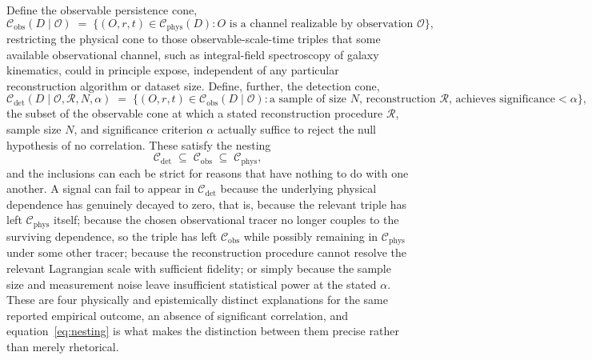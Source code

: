 \documentclass[11pt]{article}
\begin{document}
Define the observable persistence cone,
\begin{equation}
\mathcal C_{\mathrm{obs}}(D \mid \mathcal O) \;=\; \big\{ (O, r, t) \in \mathcal C_{\mathrm{phys}}(D) : O \text{ is a channel realizable by observation } \mathcal O \big\},
\end{equation}
restricting the physical cone to those observable-scale-time triples that some available observational channel, such as integral-field spectroscopy of galaxy kinematics, could in principle expose, independent of any particular reconstruction algorithm or dataset size. Define, further, the detection cone,
\begin{equation}
\mathcal C_{\mathrm{det}}(D \mid \mathcal O, \mathcal R, N, \alpha) \;=\; \big\{ (O, r, t) \in \mathcal C_{\mathrm{obs}}(D \mid \mathcal O) : \text{a sample of size } N \text{, reconstruction } \mathcal R \text{, achieves significance} < \alpha \big\},
\end{equation}
the subset of the observable cone at which a stated reconstruction procedure $\mathcal R$, sample size $N$, and significance criterion $\alpha$ actually suffice to reject the null hypothesis of no correlation. These satisfy the nesting
\begin{equation}
\mathcal C_{\mathrm{det}} \;\subseteq\; \mathcal C_{\mathrm{obs}} \;\subseteq\; \mathcal C_{\mathrm{phys}},
\label{eq:nesting}
\end{equation}
and the inclusions can each be strict for reasons that have nothing to do with one another. A signal can fail to appear in $\mathcal C_{\mathrm{det}}$ because the underlying physical dependence has genuinely decayed to zero, that is, because the relevant triple has left $\mathcal C_{\mathrm{phys}}$ itself; because the chosen observational tracer no longer couples to the surviving dependence, so the triple has left $\mathcal C_{\mathrm{obs}}$ while possibly remaining in $\mathcal C_{\mathrm{phys}}$ under some other tracer; because the reconstruction procedure cannot resolve the relevant Lagrangian scale with sufficient fidelity; or simply because the sample size and measurement noise leave insufficient statistical power at the stated $\alpha$. These are four physically and epistemically distinct explanations for the same reported empirical outcome, an absence of significant correlation, and equation~\eqref{eq:nesting} is what makes the distinction between them precise rather than merely rhetorical.
\end{document}
